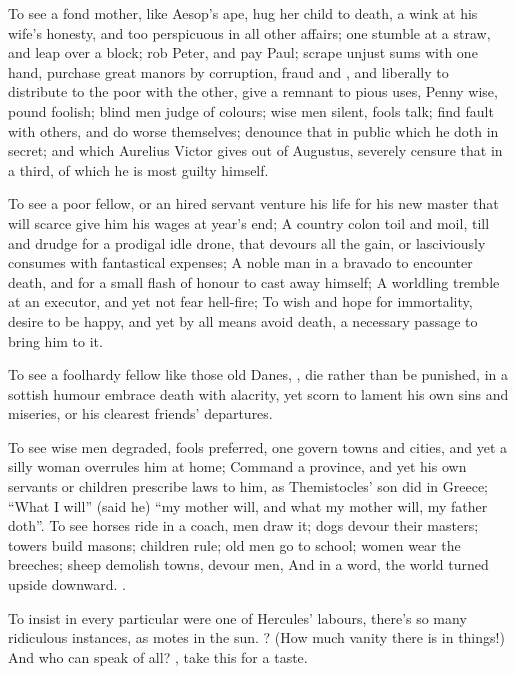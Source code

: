 To see a fond mother, like Aesop's ape, hug her child to death, a
 wink at his wife's honesty, and too perspicuous in all
other affairs; one stumble at a straw, and leap over a block; rob Peter, and
pay Paul; scrape unjust sums with one hand, purchase great manors by
corruption, fraud and , and liberally to
distribute to the poor with the other, give a remnant to pious uses, \etc{}
Penny wise, pound foolish; blind men judge of colours; wise men silent, fools
talk; find fault with others, and do worse themselves;
denounce that in public which he doth in secret; and which
Aurelius Victor gives out of Augustus, severely censure that in a third, of
which he is most guilty himself.

To see a poor fellow, or an hired servant venture his life for his new master
that will scarce give him his wages at year's end; A country colon toil and
moil, till and drudge for a prodigal idle drone, that devours all the gain, or
lasciviously consumes with fantastical expenses; A noble man in a bravado to
encounter death, and for a small flash of honour to cast away himself; A
worldling tremble at an executor, and yet not fear hell-fire; To wish and hope
for immortality, desire to be happy, and yet by all means avoid death, a
necessary passage to bring him to it.

To see a foolhardy fellow like those old Danes, , die rather than be punished, in a sottish humour embrace death with
alacrity, yet scorn to lament his own sins and miseries, or
his clearest friends' departures.

To see wise men degraded, fools preferred, one govern towns and cities, and yet
a silly woman overrules him at home; Command a province,
and yet his own servants or children prescribe laws to him, as Themistocles'
son did in Greece; \enquote{What I will} (said he) \enquote{my mother will,
and what my mother will, my father doth}. To see horses ride in a coach, men
draw it; dogs devour their masters; towers build masons; children rule; old men
go to school; women wear the breeches; sheep demolish
towns, devour men, \etc{} And in a word, the world turned upside downward.
.

To insist in every particular were one of Hercules'
labours, there's so many ridiculous instances, as motes in the sun. ? (How much vanity there is in things!) And who can speak of
all? , take this for a taste.

